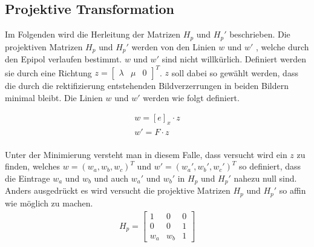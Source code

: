 \subsection{Projektive Transformation}

Im Folgenden wird die Herleitung der Matrizen $H_p$ und $H_p'$ beschrieben. Die projektiven Matrizen $H_p$ und $H_p'$ werden von den Linien $w$ und $w'$ , welche durch den Epipol verlaufen bestimmt. $w$ und $w'$ sind nicht willkürlich. Definiert werden sie durch eine Richtung $z = \begin{bmatrix}
\lambda&\mu&0\end{bmatrix}^T$. $z$ soll dabei so gewählt werden, dass die durch die rektifizierung entstehenden Bildverzerrungen in beiden Bildern minimal bleibt. Die Linien $w$ und $w'$ werden wie folgt definiert.


\begin{gather}
	w = [e]_x \cdot z \label{eq:w}\\ 
	w'= F\cdot z \label{eq:w'}
\end{gather}\\


Unter der Minimierung versteht man in diesem Falle, dass versucht wird ein $z$ zu finden, welches $w = (w_a,w_b,w_c)^T$ und $w'=(w_a',w_b',w_c')^T$ so definiert, dass die Eintrage $w_a$ und $w_b$ und auch $w_a'$ und $w_b'$ in $H_p$ und $H_p'$ nahezu null sind. Anders ausgedrückt es wird versucht die projektive Matrizen $H_p$ und $H_p'$ so affin wie möglich zu machen\cite{ZZ}.\\ 


\begin{gather}
	H_p = 	\begin{bmatrix}
		1&0&0\\
		0&0&1\\
		w_a&w_b&1
	\end{bmatrix}
\end{gather}

